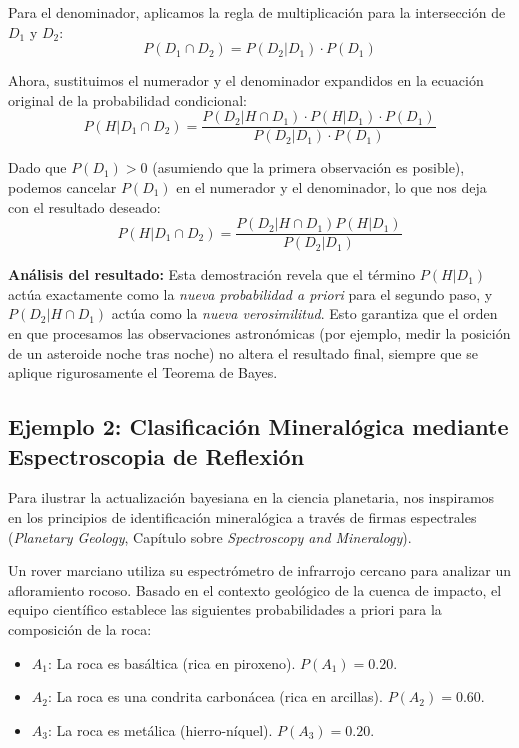 Para el denominador, aplicamos la regla de multiplicación para la intersección de $D_1$ y $D_2$:
$$ P(D_1 \cap D_2) = P(D_2 | D_1) \cdot P(D_1) $$

Ahora, sustituimos el numerador y el denominador expandidos en la ecuación original de la probabilidad condicional:
$$ P(H | D_1 \cap D_2) = \frac{P(D_2 | H \cap D_1) \cdot P(H | D_1) \cdot P(D_1)}{P(D_2 | D_1) \cdot P(D_1)} $$

Dado que $P(D_1) > 0$ (asumiendo que la primera observación es posible), podemos cancelar $P(D_1)$ en el numerador y el denominador, lo que nos deja con el resultado deseado:
$$ P(H | D_1 \cap D_2) = \frac{P(D_2 | H \cap D_1) P(H | D_1)}{P(D_2 | D_1)} $$

\textbf{Análisis del resultado:} Esta demostración revela que el término $P(H | D_1)$ actúa exactamente como la \textit{nueva probabilidad a priori} para el segundo paso, y $P(D_2 | H \cap D_1)$ actúa como la \textit{nueva verosimilitud}. Esto garantiza que el orden en que procesamos las observaciones astronómicas (por ejemplo, medir la posición de un asteroide noche tras noche) no altera el resultado final, siempre que se aplique rigurosamente el Teorema de Bayes.


\subsection{Ejemplo 2: Clasificación Mineralógica mediante Espectroscopia de Reflexión}

Para ilustrar la actualización bayesiana en la ciencia planetaria, nos inspiramos en los principios de identificación mineralógica a través de firmas espectrales (\textit{Planetary Geology}, Capítulo sobre \textit{Spectroscopy and Mineralogy}). 

Un rover marciano utiliza su espectrómetro de infrarrojo cercano para analizar un afloramiento rocoso. Basado en el contexto geológico de la cuenca de impacto, el equipo científico establece las siguientes probabilidades a priori para la composición de la roca:
\begin{itemize}
    \item $A_1$: La roca es basáltica (rica en piroxeno). $P(A_1) = 0.20$.
    \item $A_2$: La roca es una condrita carbonácea (rica en arcillas). $P(A_2) = 0.60$.
    \item $A_3$: La roca es metálica (hierro-níquel). $P(A_3) = 0.20$.
\end{itemize}

